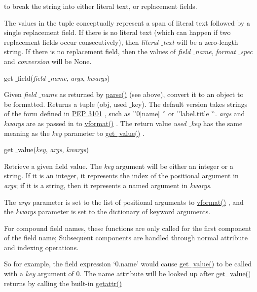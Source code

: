 \documentclass[a4paper,12pt]{report}
\begin{document}
 to break the string into either literal text, or replacement fields. \par
The values in the tuple conceptually represent a span of literal text followed by a single replacement field. If there is no literal text (which can happen if two replacement fields occur consecutively), then \emph{literal $  \_  $text} will be a zero-length string. If there is no replacement field, then the values of \emph{field $  \_  $name}, \emph{format $  \_  $spec} and \emph{conversion} will be None. \par
get $  \_  $field(\emph{field $  \_  $name}, \emph{args}, \emph{kwargs}) \par
Given \emph{field $  \_  $name} as returned by \href{https://docs.python.org/2/library/string.html}{parse()}
 (see above), convert it to an object to be formatted. Returns a tuple (obj, used $  \_  $key). The default version takes strings of the form defined in \href{https://www.python.org/dev/peps/pep-3101}{PEP 3101}
, such as  $ " $0[name] $ " $ or  $ " $label.title $ " $. \emph{args} and \emph{kwargs} are as passed in to \href{https://docs.python.org/2/library/string.html}{vformat()}
. The return value \emph{used $  \_  $key} has the same meaning as the \emph{key} parameter to \href{https://docs.python.org/2/library/string.html}{get $  \_  $value()}
. \par
get $  \_  $value(\emph{key}, \emph{args}, \emph{kwargs}) \par
Retrieve a given field value. The \emph{key} argument will be either an integer or a string. If it is an integer, it represents the index of the positional argument in \emph{args}; if it is a string, then it represents a named argument in \emph{kwargs}. \par
The \emph{args} parameter is set to the list of positional arguments to \href{https://docs.python.org/2/library/string.html}{vformat()}
, and the \emph{kwargs} parameter is set to the dictionary of keyword arguments. \par
For compound field names, these functions are only called for the first component of the field name; Subsequent components are handled through normal attribute and indexing operations. \par
So for example, the field expression ‘0.name’ would cause \href{https://docs.python.org/2/library/string.html}{get $  \_  $value()}
 to be called with a \emph{key} argument of 0. The name attribute will be looked up after \href{https://docs.python.org/2/library/string.html}{get $  \_  $value()}
 returns by calling the built-in \href{https://docs.python.org/2/library/functions.html}{getattr()}
\end{document}
